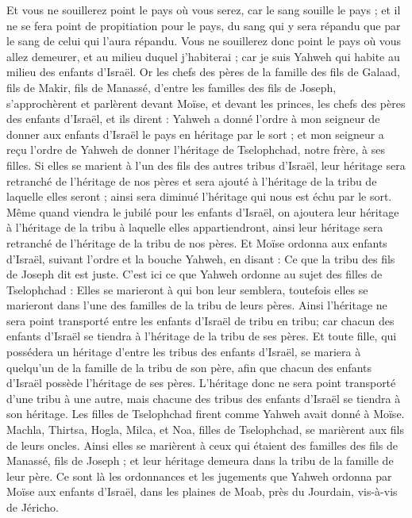 \begin{multicols}{2}
Et vous ne souillerez point le pays où vous serez, car le sang souille le pays ; et il ne se fera point de propitiation pour le pays, du sang qui y sera répandu que par le sang de celui qui l'aura répandu.
Vous ne souillerez donc point le pays où vous allez demeurer, et au milieu duquel j'habiterai ; car je suis Yahweh qui habite au milieu des enfants d'Israël.
\VerseOne{}Or les chefs des pères de la famille des fils de Galaad, fils de Makir, fils de Manassé, d'entre les familles des fils de Joseph, s'approchèrent et parlèrent devant Moïse, et devant les princes, les chefs des pères des enfants d'Israël,
et ils dirent : Yahweh a donné l'ordre à mon seigneur de donner aux enfants d'Israël le pays en héritage par le sort ; et mon seigneur a reçu l'ordre de Yahweh de donner l'héritage de Tselophchad, notre frère, à ses filles.
Si elles se marient à l'un des fils des autres tribus d'Israël, leur héritage sera retranché de l'héritage de nos pères et sera ajouté à l'héritage de la tribu de laquelle elles seront ; ainsi sera diminué l'héritage qui nous est échu par le sort.
Même quand viendra le jubilé pour les enfants d'Israël, on ajoutera leur héritage à l'héritage de la tribu à laquelle elles appartiendront, ainsi leur héritage sera retranché de l'héritage de la tribu de nos pères.
Et Moïse ordonna aux enfants d'Israël, suivant l'ordre et la bouche Yahweh, en disant : Ce que la tribu des fils de Joseph dit est juste.
C’est ici ce que Yahweh ordonne au sujet des filles de Tselophchad : Elles se marieront à qui bon leur semblera, toutefois elles se marieront dans l'une des familles de la tribu de leurs pères.
Ainsi l’héritage ne sera point transporté entre les enfants d'Israël de tribu en tribu; car chacun des enfants d'Israël se tiendra à l'héritage de la tribu de ses pères.
Et toute fille, qui possédera un héritage d’entre les tribus des enfants d'Israël, se mariera à quelqu'un de la famille de la tribu de son père, afin que chacun des enfants d'Israël possède l'héritage de ses pères.
L'héritage donc ne sera point transporté d'une tribu à une autre, mais chacune des tribus des enfants d'Israël se tiendra à son héritage.
Les filles de Tselophchad firent comme Yahweh avait donné à Moïse.
Machla, Thirtsa, Hogla, Milca, et Noa, filles de Tselophchad, se marièrent aux fils de leurs oncles.
Ainsi elles se marièrent à ceux qui étaient des familles des fils de Manassé, fils de Joseph ; et leur héritage demeura dans la tribu de la famille de leur père.
Ce sont là les ordonnances et les jugements que Yahweh ordonna par Moïse aux enfants d'Israël, dans les plaines de Moab, près du Jourdain, vis-à-vis de Jéricho.
\PPE{}
\end{multicols}

